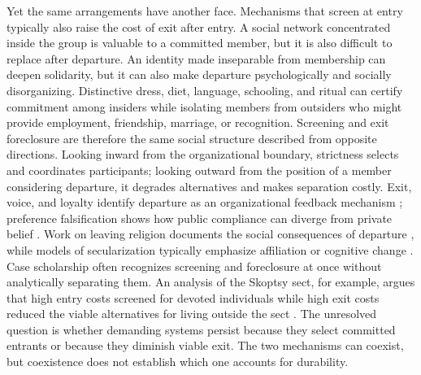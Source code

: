 \documentclass[12pt]{article}
\begin{document}
Yet the same arrangements have another face. Mechanisms that screen at entry typically also raise the cost of exit after entry. A social network concentrated inside the group is valuable to a committed member, but it is also difficult to replace after departure. An identity made inseparable from membership can deepen solidarity, but it can also make departure psychologically and socially disorganizing. Distinctive dress, diet, language, schooling, and ritual can certify commitment among insiders while isolating members from outsiders who might provide employment, friendship, marriage, or recognition. Screening and exit foreclosure are therefore the same social structure described from opposite directions. Looking inward from the organizational boundary, strictness selects and coordinates participants; looking outward from the position of a member considering departure, it degrades alternatives and makes separation costly. Exit, voice, and loyalty identify departure as an organizational feedback mechanism \citep{hirschman1970}; preference falsification shows how public compliance can diverge from private belief \citep{kuran1995}. Work on leaving religion documents the social consequences of departure \citep{bromley1998,cragun2011,streib2009}, while models of secularization typically emphasize affiliation or cognitive change \citep{gelfand2011,norenzayan2013}. Case scholarship often recognizes screening and foreclosure at once without analytically separating them. An analysis of the Skoptsy sect, for example, argues that high entry costs screened for devoted individuals while high exit costs reduced the viable alternatives for living outside the sect \citep{engelstein1999}. The unresolved question is whether demanding systems persist because they select committed entrants or because they diminish viable exit. The two mechanisms can coexist, but coexistence does not establish which one accounts for durability.
\end{document}
